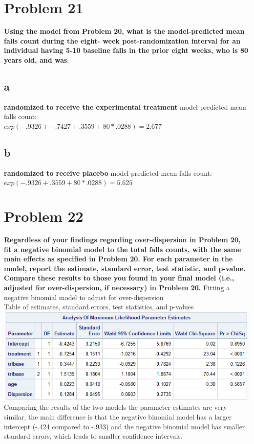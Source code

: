 \documentclass{article}
\begin{document}
\begin{flushleft}
\section*{Problem 21}
\textbf{Using the model from Problem 20, what is the model-predicted mean falls count during the eight-
	week post-randomization interval for an individual having 5-10 baseline falls in the prior eight
	weeks, who is 80 years old, and was}:
\subsection*{a} \textbf{randomized to receive the experimental treatment}\medbreak
 model-predicted mean falls count:\\
$exp(-.9326+-.7427+.3559+80*.0288)=2.677$

\subsection*{b} \textbf{randomized to receive placebo}\medbreak
 model-predicted mean falls count:\\
$exp(-.9326+.3559+80*.0288)=5.625$
\pagebreak
\section*{Problem 22}
\textbf{ Regardless of your findings regarding over-dispersion in Problem 20, fit a negative binomial model
	to the total falls counts, with the same main effects as specified in Problem 20. For each parameter
	in the model, report the estimate, standard error, test statistic, and p-value. Compare these results to
	those you found in your final model (i.e., adjusted for over-dispersion, if necessary) in Problem 20.}\medbreak
Fitting a negative binomial model to adjust for over-dispersion\\
Table of estimates, standard errors, test statistics, and p-values\\
\includegraphics[scale=.6]{nb.png}\\
Comparing the results of the two models the parameter estimates are very similar, the main difference is that the negative binomial model has a larger intercept (-.424 compared to -.933) and the negative binomial model has smaller standard errors, which leads to smaller confidence intervals.
\pagebreak

\end{flushleft}
\end{document}
